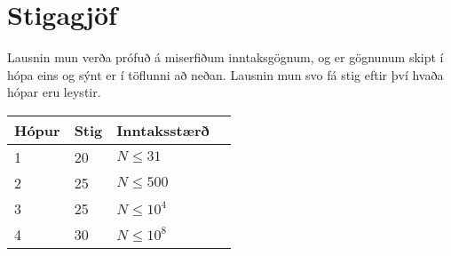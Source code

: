 \section*{Stigagjöf}
Lausnin mun verða prófuð á miserfiðum inntaksgögnum, og er gögnunum skipt í
hópa eins og sýnt er í töflunni að neðan. Lausnin mun svo fá stig eftir því
hvaða hópar eru leystir.

\begin{tabular}{|l|l|l|l|}
\hline
Hópur & Stig & Inntaksstærð \\ \hline
1     & 20   & $N \le 31$ \\ \hline
2     & 25   & $N \le 500$ \\ \hline
3     & 25   & $N \le 10^4$ \\ \hline
4     & 30   & $N \le 10^8$ \\ \hline
\end{tabular}
